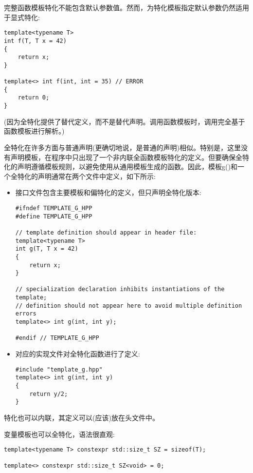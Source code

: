 完整函数模板特化不能包含默认参数值。然而，为特化模板指定默认参数仍然适用于显式特化:

\begin{lstlisting}[style=styleCXX]
template<typename T>
int f(T, T x = 42)
{
	return x;
}

template<> int f(int, int = 35) // ERROR
{
	return 0;
}
\end{lstlisting}

(因为全特化提供了替代定义，而不是替代声明。调用函数模板时，调用完全基于函数模板进行解析。)

全特化在许多方面与普通声明(更确切地说，是普通的声明)相似。特别是，这里没有声明模板，在程序中只出现了一个非内联全函数模板特化的定义。但要确保全特化的声明遵循模板规则，以避免使用从通用模板生成的函数。因此，模板g()和一个全特化的声明通常在两个文件中定义，如下所示:

\begin{itemize}
\item 
接口文件包含主要模板和偏特化的定义，但只声明全特化版本:

\begin{lstlisting}[style=styleCXX]
#ifndef TEMPLATE_G_HPP
#define TEMPLATE_G_HPP

// template definition should appear in header file:
template<typename T>
int g(T, T x = 42)
{
	return x;
}

// specialization declaration inhibits instantiations of the template;
// definition should not appear here to avoid multiple definition errors
template<> int g(int, int y);

#endif // TEMPLATE_G_HPP
\end{lstlisting}

\item 
对应的实现文件对全特化函数进行了定义:

\begin{lstlisting}[style=styleCXX]
#include "template_g.hpp"
template<> int g(int, int y)
{
	return y/2;
}
\end{lstlisting}
\end{itemize}

特化也可以内联，其定义可以(应该)放在头文件中。


变量模板也可以全特化，语法很直观:

\begin{lstlisting}[style=styleCXX]
template<typename T> constexpr std::size_t SZ = sizeof(T);

template<> constexpr std::size_t SZ<void> = 0;
\end{lstlisting}

